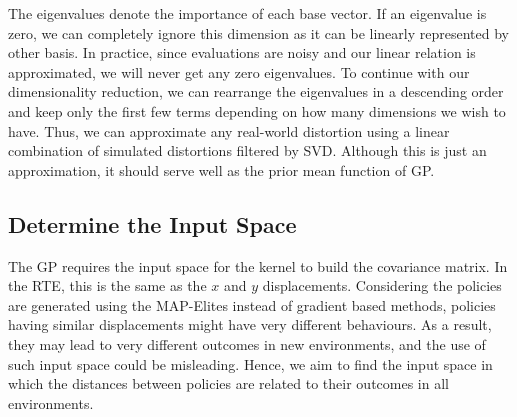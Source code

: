 \documentclass[journal]{IEEEtran}
\begin{document}
The eigenvalues denote the importance of each base vector.
If an eigenvalue is zero, we can completely ignore this dimension as it can be linearly represented by other basis.
In practice, since evaluations are noisy and our linear relation is approximated, we will never get any zero eigenvalues. 
To continue with our dimensionality reduction, we can rearrange the eigenvalues in a descending order and keep only the first few terms depending on how many dimensions we wish to have.
Thus, we can approximate any real-world distortion using a linear combination of simulated distortions filtered by SVD.
Although this is just an approximation, it should serve well as the prior mean function of GP.


\subsection{Determine the Input Space}
The GP requires the input space for the kernel to build the covariance matrix.
In the RTE, this is the same as the $x$ and $y$ displacements.
Considering the policies are generated using the MAP-Elites instead of gradient based methods, policies having similar displacements might have very different behaviours.
As a result, they may lead to very different outcomes in new environments, and the use of such input space could be misleading.
Hence, we aim to find the input space in which the distances between policies are related to their outcomes in all environments. 
\end{document}
